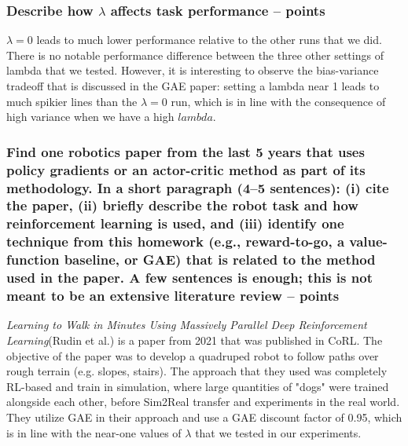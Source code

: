 \documentclass{article}
\begin{document}
\subsubsection{Describe how $\lambda$ affects task performance --  points\rbrack}
\begin{answer}[title=Q8.1.3,height=4cm,width=\linewidth]
$\lambda = 0$ leads to much lower performance relative to the other runs that we did. There is no notable performance difference between the three other settings of lambda that we tested. However, it is interesting to observe the bias-variance tradeoff that is discussed in the GAE paper: setting a lambda near 1 leads to much spikier lines than the $\lambda=0$ run, which is in line with the consequence of high variance when we have a high $lambda$.
\end{answer}

\subsubsection{Find one robotics paper from the last 5 years that uses policy gradients or an actor-critic method as part of its methodology. 
    In a short paragraph (4--5 sentences): (i) cite the paper, (ii) briefly describe the robot task and how reinforcement learning is used, and (iii) identify one technique from this homework (e.g., reward-to-go, a value-function baseline, or GAE) that is related to the method used in the paper. A few sentences is enough; this is not meant to be an extensive literature review  --  points\rbrack
}
\begin{answer}[title=Q8.1.4,height=4cm,width=\linewidth]
    \textit{Learning to Walk in Minutes Using Massively Parallel Deep Reinforcement Learning}(Rudin et al.) is a paper from 2021 that was published in CoRL. The objective of the paper was to develop a quadruped robot to follow paths over rough terrain (e.g. slopes, stairs). The approach that they used was completely RL-based and train in simulation, where large quantities of "dogs" were trained alongside each other, before Sim2Real transfer and experiments in the real world. They utilize GAE in their approach and use a GAE discount factor of 0.95, which is in line with the near-one values of $\lambda$ that we tested in our experiments.
\end{answer}
\end{document}
